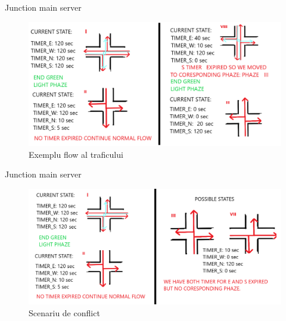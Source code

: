 \documentclass{beamer}
\begin{document}
    \begin{frame}{Junction main server}
        \begin{figure}[h!]
            \includegraphics[width=\textwidth]{Sketches/SwitchingTroughphasesExample.png}
            \caption{Exemplu flow al traficului}
            \label{fig:phasesSwitchingExample}
        \end{figure}
        
    
    \end{frame}
    \begin{frame}{Junction main server}
        
        \begin{figure}[h!]
            \includegraphics[width=\textwidth]{Sketches/phaseSwitchingCaseToBeAvoided.png}
            \caption{Scenariu de conflict}
            \label{fig:FaultyphaseSwitching}
        \end{figure}

    \end{frame}
\end{document}
